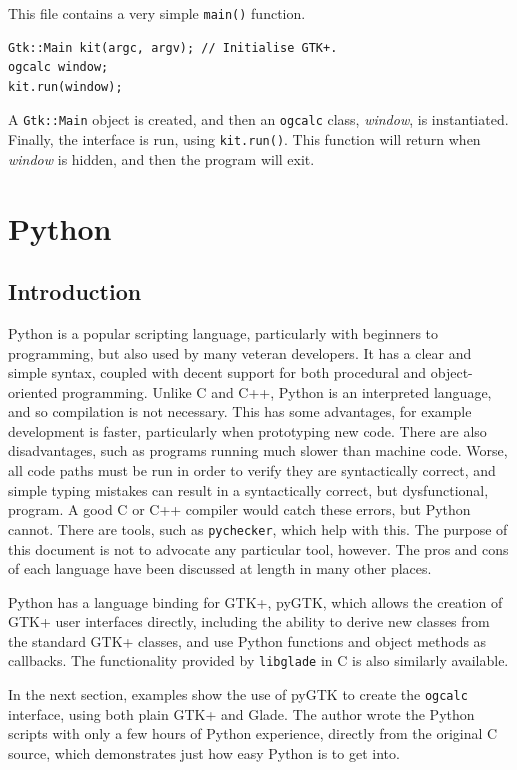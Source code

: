 \documentclass[a4paper,oneside]{article}
\newcommand{\program}[1]{\texttt{#1}}
\newcommand{\variable}[1]{\textsl{#1}}
\newcommand{\class}[1]{\texttt{#1}}
\newcommand{\function}[1]{\texttt{#1()}}
\newcommand{\code}[1]{\texttt{#1}}
\begin{document}
This file contains a very simple \function{main} function.

\begin{lstlisting}[numbers=none, language={[GNU]C++}]
Gtk::Main kit(argc, argv); // Initialise GTK+.
ogcalc window;
kit.run(window);
\end{lstlisting}

A \class{Gtk::Main} object is created, and then an \class{ogcalc}
class, \variable{window}, is instantiated.  Finally, the interface is
run, using \code{kit.run()}.  This function will return when
\variable{window} is hidden, and then the program will exit.

\section{Python}

\label{sec:python}

\subsection{Introduction}

Python is a popular scripting language, particularly with beginners to
programming, but also used by many veteran developers.  It has a clear
and simple syntax, coupled with decent support for both procedural and
object-oriented programming.  Unlike C and C++, Python is an
interpreted language, and so compilation is not necessary.  This has
some advantages, for example development is faster, particularly when
prototyping new code.  There are also disadvantages, such as programs
running much slower than machine code.  Worse, all code paths must be
run in order to verify they are syntactically correct, and simple
typing mistakes can result in a syntactically correct, but
dysfunctional, program.  A good C or C++ compiler would catch these
errors, but Python cannot.  There are tools, such as
\program{pychecker}, which help with this.  The purpose of this
document is not to advocate any particular tool, however.  The pros
and cons of each language have been discussed at length in many other
places.

Python has a language binding for GTK+, pyGTK, which allows the
creation of GTK+ user interfaces directly, including the ability to
derive new classes from the standard GTK+ classes, and use Python
functions and object methods as callbacks.  The functionality
provided by \program{libglade} in C is also similarly available.

In the next section, examples show the use of pyGTK to create the
\program{ogcalc} interface, using both plain GTK+ and Glade.
The author wrote the Python scripts with only a few hours of Python
experience, directly from the original C source, which demonstrates
just how easy Python is to get into.
\end{document}
